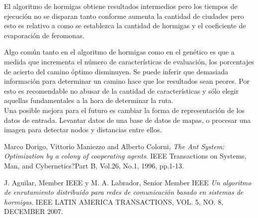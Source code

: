\documentclass[conference,a4paper,10pt,oneside,final]{tfmpd}
\begin{document}
El algoritmo de hormigas obtiene resultados intermedios pero los tiempos de ejecución no se disparan tanto conforme aumenta la cantidad de ciudades pero esto es relativo a como se establezca la cantidad de hormigas y el coeficiente de evaporación de feromonas. 

Algo común tanto en el algoritmo de hormigas como en el genético es que a medida que incrementa el número de características de evaluación, los porcentajes de acierto del camino óptimo disminuyen. Se puede inferir que demasiada información para determinar un camino hace que los resultados sean peores. Por esto es recomendable no abusar de la cantidad de características y sólo elegir aquellas fundamentales a la hora de determinar la ruta. \\

Una posible mejora para el futuro es cambiar la forma de representación de los datos de entrada. Levantar datos de una base de datos de mapas, o procesar una imagen para detectar nodos y distancias entre ellos.

\begin{thebibliography}{99}
Marco Dorigo, Vittorio Maniezzo and Alberto Colorni,
\emph{The Ant System: Optimization by a colony of cooperating agents}. 
IEEE Transactions on Systems, Man, and Cybernetics?Part B, Vol.26, No.1, 1996, pp.1-13.

J. Aguilar, Member IEEE y M. A. Labrador, Senior Member IEEE
\emph{Un algoritmo de enrutamiento distribuido para redes de comunicación basado en sistemas de hormigas}. 
IEEE LATIN AMERICA TRANSACTIONS, VOL. 5, NO. 8,
DECEMBER 2007.
\end{thebibliography}
\end{document}
